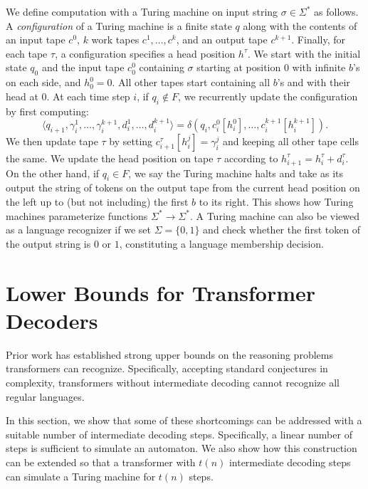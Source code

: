 We define computation with a Turing machine on input string $\sigma \in \Sigma^*$ as follows.
A \emph{configuration} of a Turing machine is a finite state $q$ along with the contents of an input tape $c^0$, $k$ work tapes $c^1, \ldots, c^k$, and an output tape $c^{k+1}$. Finally, for each tape $\tau$, a configuration specifies a head position $h^\tau$.
We start with the initial state $q_0$ and the input tape $c^0_0$ containing $\sigma$ starting at position $0$ with infinite $b$'s on each side, and $h^0_0 = 0$.
All other tapes start containing all $b$'s and with their head at $0$. 
At each time step $i$, if $q_i \not\in F$, we recurrently update the configuration by first computing:
\begin{equation*}
    \langle q_{i+1}, \gamma^1_i, \ldots, \gamma^{k+1}_i, d^1_i, \ldots, d^{k+1}_i \rangle = \delta(q_i, c^0_i[h^0_i], \ldots, c^{k+1}_i[h^{k+1}_i]) .
\end{equation*}
We then update tape $\tau$ by setting $c^\tau_{i+1}[h^j_i] = \gamma^j_i$ and keeping all other tape cells the same. We update the head position on tape $\tau$ according to $h^\tau_{i+1} = h^\tau_i + d^\tau_i$.
% 
On the other hand, if $q_i \in F$, we say the Turing machine halts and take as its output the string of tokens on the output tape from the current head position on the left up to (but not including) the first $b$ to its right. This shows how Turing machines parameterize functions $\Sigma^* \to \Sigma^*$.
% 
A Turing machine can also be viewed as a language recognizer if we set $\Sigma = \{0, 1\}$ and check whether the first token of the output string is $0$ or $1$, constituting a language membership decision.



\section{Lower Bounds for Transformer Decoders}
\label{sec:lower-bounds}

Prior work \citep{merrill2023logic} has established strong upper bounds on the reasoning problems transformers can recognize. Specifically, accepting standard conjectures in complexity, transformers without intermediate decoding cannot recognize all regular languages.

In this section, we show that some of these shortcomings can be addressed with a suitable number of intermediate decoding steps. Specifically, a linear number of steps is sufficient to simulate an automaton. We also show how this construction can be extended so that a transformer with $t(n)$ intermediate decoding steps can simulate a Turing machine for $t(n)$ steps.

